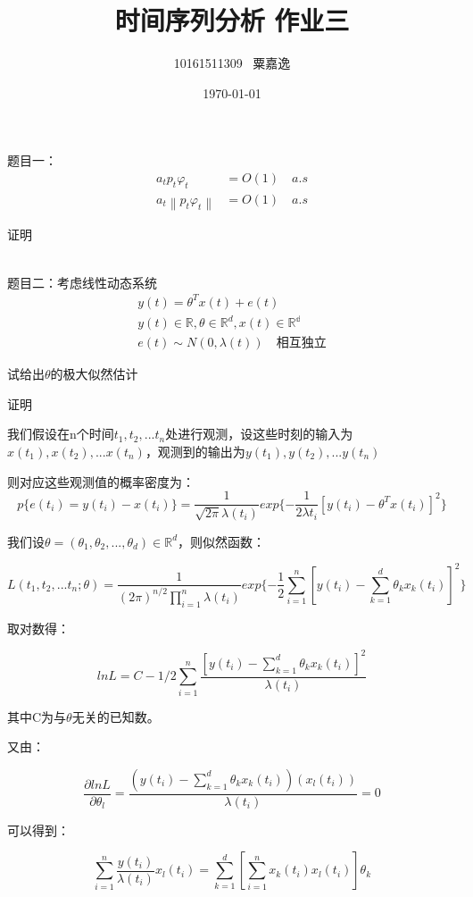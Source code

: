 \documentclass[12pt, a4paper]{ctexart}
\title{时间序列分析 作业三}
\author{10161511309 \, 粟嘉逸}
\date{\today}
\begin{document}
\maketitle{}

\begin{flushleft}
	\qquad 题目一：
		\begin{align*}
			a_tp_t\varphi_t&=O(1) \quad a.s\\
			a_t\left\| p_t\varphi_t\right\| &=O(1) \quad a.s
		\end{align*}

	\qquad 证明
	
		
		~\\	
	\qquad 题目二：考虑线性动态系统
		\begin{gather*}
			y(t)=\theta^{T}x(t)+e(t)\\
			y(t)\in \mathbb{R},\theta\in \mathbb{R}^d,x(t)\in \mathbb{R^d}\\
			e(t)\sim N(0,\lambda(t)) \quad \mbox{相互独立}
		\end{gather*}
		
	\qquad 试给出$\theta$的极大似然估计
	
    \qquad 证明
    
    我们假设在n个时间$t_1,t_2,...t_n$处进行观测，设这些时刻的输入为$x(t_1),x(t_2),...x(t_n)$，观测到的输出为$y(t_1),y(t_2),...y(t_n)$

    则对应这些观测值的概率密度为：
    \[
        p\{e(t_i)=y(t_i)-x(t_i)\}=\dfrac{1}{\sqrt{2\pi}\lambda(t_i)}exp\{-\frac{1}{2\lambda{t_i}}[y(t_i)-\theta^Tx(t_i)]^2\}
    \]

    我们设$\theta = (\theta_1,\theta_2,...,\theta_d) \in \mathbb{R}^d$，则似然函数：

    \[
        L(t_1,t_2,...t_n;\theta) = \dfrac{1}{{(2\pi)}^{n/2}\prod_{i=1}^n\lambda(t_i)}exp\{-\frac{1}{2}\sum_{i=1}^n[y(t_i)-\sum_{k=1}^d{\theta_kx_k(t_i)}]^2\}
    \]

    取对数得：

    \[
        ln L = C - 1/2 \sum^n_{i=1}\dfrac{[y(t_i)-\sum_{k=1}^d{\theta_kx_k(t_i)}]^2}{\lambda(t_i)}
    \]

    其中C为与$\theta$无关的已知数。

    又由：

    \[
        \dfrac{\partial lnL}{\partial \theta_l} =\dfrac{(y(t_i)-\sum_{k=1}^d\theta_kx_k(t_i))(x_l(t_i))}{\lambda(t_i)}=0
    \]

    可以得到：

    \[
        \sum_{i=1}^n \dfrac{y(t_i)}{\lambda(t_i)} x_l(t_i) = \sum_{k=1}^d[\sum_{i=1}^nx_k(t_i)x_l(t_i)]\theta_k
    \]


\end{flushleft}
\end{document}
